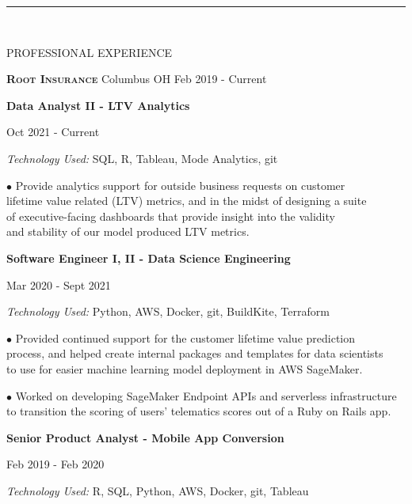 \documentclass[12pt]{article}
\newcommand\tab[1][1cm]{\hspace*{#1}}
\newcommand\header[1][Section Header]{
    \vspace*{-2mm}
    \rule{6.5in}{3pt} \\
    \smallskip
    \begin{large}
	    \textsc{\textcolor{lblue}{#1}}
    \end{large}
    \medskip
}
\begin{document}
  \begin{flushleft}
    \header[PROFESSIONAL EXPERIENCE]

    \textsc{\textbf{Root Insurance}} \tab \small {Columbus OH} \hfill \small {Feb 2019 - Current} \\
    \smallskip

    \tab \textbf{Data Analyst II - LTV Analytics} \hfill {\footnotesize Oct 2021 {-} Current \par}
    \tab[1.25cm] \textit{Technology Used:} SQL, R, Tableau, Mode Analytics, git \\
    \vspace*{0.5mm}

    \tab[1.25cm] $\bullet$ Provide analytics support for outside business requests on customer \\
    \tab[1.6cm] lifetime value related (LTV) metrics, and in the midst of designing a suite \\
    \tab[1.6cm] of executive-facing dashboards that provide insight into the validity \\
    \tab[1.6cm] and stability of our model produced LTV metrics.
    \medskip

    \tab \textbf{Software Engineer I, II - Data Science Engineering} \hfill {\footnotesize Mar 2020 - Sept 2021 \par}
    \tab[1.25cm] \textit{Technology Used:} Python, AWS, Docker, git, BuildKite, Terraform \\
    \vspace*{0.5mm}

    \tab[1.25cm] $\bullet$ Provided continued support for the customer lifetime value prediction \\
    \tab[1.6cm] process, and helped create internal packages and templates for data scientists \\
    \tab[1.6cm] to use for easier machine learning model deployment in AWS SageMaker. \\
    \vspace*{0.5mm}

    \tab[1.25cm] $\bullet$ Worked on developing SageMaker Endpoint APIs and serverless infrastructure \\
    \tab[1.6cm] to transition the scoring of users' telematics scores out of a Ruby on Rails app. \\
    \medskip

    \tab \textbf{Senior Product Analyst - Mobile App Conversion} \hfill {\footnotesize Feb 2019 - Feb 2020 \par}
    \tab[1.25cm] \textit{Technology Used:} R, SQL, Python, AWS, Docker, git, Tableau \\
    \vspace*{0.5mm}


\end{flushleft}
\end{document}
